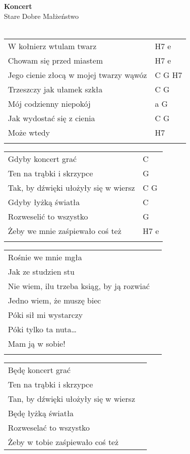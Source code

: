 \documentclass[a5paper]{article}
\begin{document}


\noindent
\fontsize{12pt}{15pt}\selectfont
\textbf{Koncert} \\
\fontsize{8pt}{10pt}\selectfont
Stare Dobre Małżeństwo \\ \\
\fontsize{10pt}{12pt}\selectfont
{}
\begin{tabular}{@{}p{8.50cm}p{3cm}@{}}
\noindent
W kołnierz wtulam twarz & H7 e \\
Chowam się przed miastem & H7 e \\
Jego cienie złocą w mojej twarzy wąwóz & C G H7 \\
Trzeszczy jak ułamek szkła & C G \\
Mój codzienny niepokój & a G \\
Jak wydostać się z cienia & C G \\
Może wtedy & H7 \\ \\
\end{tabular}

\noindent
\begin{tabular}{@{}p{7.50cm}p{3cm}@{}}
Gdyby koncert grać & C \\
Ten na trąbki i skrzypce & G \\
Tak, by dźwięki ułożyły się w wiersz & C G \\
Gdyby łyżką światła & C \\
Rozweselić to wszystko & G \\
Żeby we mnie zaśpiewało coś też & H7 e \\ \\
\end{tabular}

\noindent
\begin{tabular}{@{}p{7.50cm}p{3cm}@{}}
Rośnie we mnie mgła \\
Jak ze studzien stu \\
Nie wiem, ilu trzeba ksiąg, by ją rozwiać \\
Jedno wiem, że muszę biec \\
Póki sił mi wystarczy \\
Póki tylko ta nuta… \\
Mam ją w sobie! \\ \\
\end{tabular}

\noindent
\begin{tabular}{@{}p{7.50cm}p{3cm}@{}}
Będę koncert grać \\
Ten na trąbki i skrzypce \\
Tan, by dźwięki ułożyły się w wiersz \\
Będę łyżką światła \\
Rozweselać to wszystko \\
Żeby w tobie zaśpiewało coś też 
\end{tabular}
\end{document}
